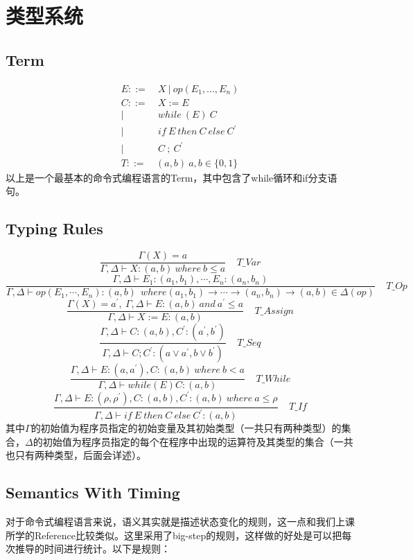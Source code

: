 \documentclass{ctexart}
\begin{document}
\section{类型系统}
\subsection{Term}
\begin{align*}
E ::= & ~X~|~op(E_1, ..., E_n) \\
C ::= & ~X:=E \\
	| & ~while~(E)~{C} \\
	| & ~if~E~then~C~else~C^\prime \\
	| & ~C~;~C^\prime \\
T ::= & (a,b)~a,b\in \{0,1\}
\end{align*}
以上是一个最基本的命令式编程语言的Term，其中包含了while循环和if分支语句。
\subsection{Typing Rules}
\[
\dfrac{\Gamma(X)=a}{\Gamma,\Delta\vdash X:(a,b)~where~b\leqslant a}~~~~~T{\_}Var
\]
\[
\dfrac{\Gamma,\Delta\vdash E_1:(a_1,b_1), \cdots, E_n:(a_n,b_n)}{\Gamma,\Delta\vdash op(E_1,\cdots,E_n):(a,b)~~where (a_1,b_1)\rightarrow\cdots\rightarrow(a_n,b_n)\rightarrow(a,b) \in \Delta(op)}~~~~~T{\_}Op
\]
\[
\dfrac{\Gamma(X)=a^\prime,~\Gamma,\Delta\vdash E:(a,b)~and~a^\prime\leqslant a}{\Gamma,\Delta\vdash X:=E:(a,b)}~~~~~T\_Assign
\]
\[
\dfrac{\Gamma,\Delta\vdash C:(a,b), C^\prime:(a^\prime,b^\prime)}{\Gamma,\Delta\vdash C;C^\prime:(a\vee a^\prime,b\vee b^\prime)}~~~~~T\_Seq
\]
\[
\dfrac{\Gamma,\Delta\vdash E:(a,a^\prime), C:(a,b)~where~b<a}{\Gamma,\Delta\vdash while(E){C}:(a,b)}~~~~~T\_While
\]
\[
\dfrac{\Gamma,\Delta\vdash E:(\rho,\rho^\prime), C:(a,b), C^\prime:(a,b)~where~a\leqslant \rho}{\Gamma,\Delta\vdash if~E~then~C~else~C^\prime:(a,b)}~~~~~T\_If
\]
其中$\Gamma$的初始值为程序员指定的初始变量及其初始类型（一共只有两种类型）的集合，$\Delta$的初始值为程序员指定的每个在程序中出现的运算符及其类型的集合（一共也只有两种类型，后面会详述）。

\subsection{Semantics With Timing}
对于命令式编程语言来说，语义其实就是描述状态变化的规则，这一点和我们上课所学的Reference比较类似。这里采用了big-step的规则，这样做的好处是可以把每次推导的时间进行统计。以下是规则：
\end{document}
